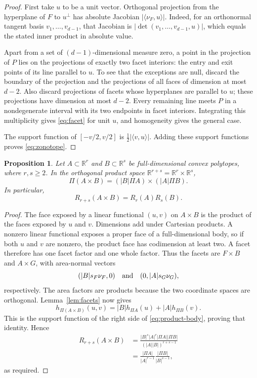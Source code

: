 \documentclass[11pt]{article}
\newtheorem{proposition}[theorem]{Proposition}
\newcommand{\R}{\mathbb R}
\begin{document}
\begin{proof}
First take \(u\) to be a unit vector. Orthogonal projection from the
hyperplane of \(F\) to \(u^\perp\) has absolute Jacobian
\(|\langle\nu_F,u\rangle|\). Indeed, for an orthonormal tangent basis
\(v_1,\ldots,v_{d-1}\), that Jacobian is
\(|\det(v_1,\ldots,v_{d-1},u)|\), which equals the stated inner product
in absolute value.

Apart from a set of \((d-1)\)-dimensional measure zero, a point in the
projection of \(P\) lies on the projections of exactly two facet
interiors: the entry and exit points of its line parallel to \(u\).
To see that the exceptions are null, discard the boundary of the
projection and the projections of all faces of dimension at most
\(d-2\). Also discard projections of facets whose hyperplanes are parallel to
\(u\); these projections have dimension at most \(d-2\).
Every remaining line meets \(P\) in a nondegenerate interval with its
two endpoints in facet interiors. Integrating this multiplicity gives
\eqref{eq:facet} for unit \(u\), and homogeneity gives the general case.

The support function of \([-v/2,v/2]\) is
\(\tfrac12|\langle v,u\rangle|\). Adding these support functions proves
\eqref{eq:zonotope}.
\end{proof}

\begin{proposition}\label{prop:product}
Let \(A\subset\R^r\) and \(B\subset\R^s\) be full-dimensional convex
polytopes, where \(r,s\ge2\). In the orthogonal product space
\(\R^{r+s}=\R^r\times\R^s\),
\begin{equation}\label{eq:product-body}
 \Pi(A\times B)=(|B|\Pi A)\times(|A|\Pi B).
\end{equation}
In particular,
\begin{equation}\label{eq:multiplicative}
 R_{r+s}(A\times B)=R_r(A)R_s(B).
\end{equation}
\end{proposition}

\begin{proof}
The face exposed by a linear functional \((u,v)\) on \(A\times B\)
is the product of the faces exposed by \(u\) and \(v\).
Dimensions add under Cartesian products. A nonzero linear functional
exposes a proper face of a full-dimensional body, so if both \(u\) and
\(v\) are nonzero, the product face has codimension at least two.
A facet therefore has one facet factor and one whole factor.
Thus the facets are \(F\times B\)
and \(A\times G\), with area-normal vectors
\[
 (|B|s_F\nu_F,0)
 \quad\hbox{and}\quad
 (0,|A|s_G\nu_G),
\]
respectively. The area factors are products because the two coordinate
spaces are orthogonal. Lemma~\ref{lem:facets} now gives
\[
 h_{\Pi(A\times B)}(u,v)
 =|B|h_{\Pi A}(u)+|A|h_{\Pi B}(v).
\]
This is the support function of the right side of
\eqref{eq:product-body}, proving that identity. Hence
\[
 \begin{split}
 R_{r+s}(A\times B)
 &=\frac{|B|^s|A|^r|\Pi A||\Pi B|}
         {(|A||B|)^{r+s-1}}\\
 &=\frac{|\Pi A|}{|A|^{r-1}}
   \frac{|\Pi B|}{|B|^{s-1}},
 \end{split}
\]
as required.
\end{proof}
\end{document}
